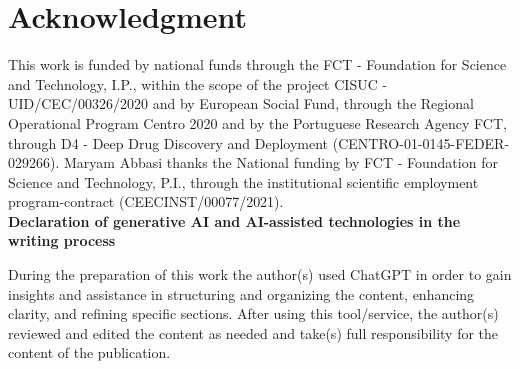 \documentclass[preprint,12pt]{elsarticle}
\begin{document}
\section*{Acknowledgment}
This work is funded by national funds through the FCT - Foundation for Science and Technology, I.P., within the scope of the project CISUC - UID/CEC/00326/2020 and by European Social Fund, through the Regional Operational Program Centro 2020 and by the Portuguese Research Agency FCT, through D4 - Deep Drug Discovery and Deployment (CENTRO-01-0145-FEDER-029266). Maryam Abbasi thanks the National funding by FCT - Foundation for Science and Technology, P.I., through the institutional scientific employment program-contract (CEECINST/00077/2021).\\

\textbf{Declaration of generative AI and AI-assisted technologies in the writing process}

During the preparation of this work the author(s) used ChatGPT in order to gain insights and assistance in structuring and organizing the content, enhancing clarity, and refining specific sections. After using this tool/service, the author(s) reviewed and edited the content as needed and take(s) full responsibility for the content of the publication.
 
 

\end{document}
